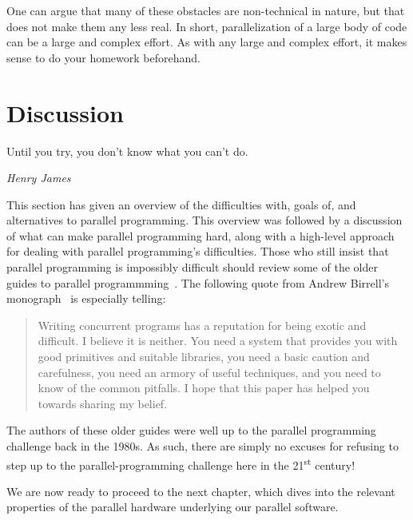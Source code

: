 {	One can argue that many of these obstacles are non-technical
	in nature, but that does not make them any less real.
	In short, parallelization of a large body of code
	can be a large and complex effort.
	As with any large and complex effort, it makes sense to
	do your homework beforehand.
}\QuickQuizEnd

\section{Discussion}
\label{sec:intro:Discussion}
%
\epigraph{Until you try, you don't know what you can't do.}
	 {\emph{Henry James}}

This section has given an overview of the difficulties with, goals of,
and alternatives to parallel programming.
This overview was followed by a discussion of
what can make parallel programming hard, along with a high-level
approach for dealing with parallel programming's difficulties.
Those who still insist that parallel programming is impossibly difficult
should review some of the older guides to parallel
programmming~\cite{SQNTParallel,AndrewDBirrell1989Threads,Beck85,Inman85}.
The following quote from Andrew Birrell's
monograph~\cite{AndrewDBirrell1989Threads} is especially telling:

\begin{quote}
	Writing concurrent programs has a reputation for being exotic
	and difficult. I believe it is neither. You need a system
	that provides you with good primitives and suitable libraries,
	you need a basic caution and carefulness, you need an armory of
	useful techniques, and you need to know of the common pitfalls. I
	hope that this paper has helped you towards sharing my belief.
\end{quote}

The authors of these older guides were well up to the parallel programming
challenge back in the 1980s.
As such, there are simply no excuses for refusing to step up to the
parallel-programming challenge here in the 21\textsuperscript{st} century!

We are now ready to proceed to the next chapter, which dives into the
relevant properties of the parallel hardware underlying our parallel
software.

